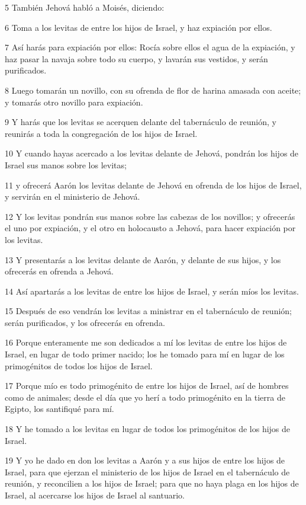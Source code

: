 \par 5 También Jehová habló a Moisés, diciendo:
\par 6 Toma a los levitas de entre los hijos de Israel, y haz expiación por ellos.
\par 7 Así harás para expiación por ellos: Rocía sobre ellos el agua de la expiación, y haz pasar la navaja sobre todo su cuerpo, y lavarán sus vestidos, y serán purificados.
\par 8 Luego tomarán un novillo, con su ofrenda de flor de harina amasada con aceite; y tomarás otro novillo para expiación.
\par 9 Y harás que los levitas se acerquen delante del tabernáculo de reunión, y reunirás a toda la congregación de los hijos de Israel.
\par 10 Y cuando hayas acercado a los levitas delante de Jehová, pondrán los hijos de Israel sus manos sobre los levitas;
\par 11 y ofrecerá Aarón los levitas delante de Jehová en ofrenda de los hijos de Israel, y servirán en el ministerio de Jehová.
\par 12 Y los levitas pondrán sus manos sobre las cabezas de los novillos; y ofrecerás el uno por expiación, y el otro en holocausto a Jehová, para hacer expiación por los levitas.
\par 13 Y presentarás a los levitas delante de Aarón, y delante de sus hijos, y los ofrecerás en ofrenda a Jehová.
\par 14 Así apartarás a los levitas de entre los hijos de Israel, y serán míos los levitas.
\par 15 Después de eso vendrán los levitas a ministrar en el tabernáculo de reunión; serán purificados, y los ofrecerás en ofrenda.
\par 16 Porque enteramente me son dedicados a mí los levitas de entre los hijos de Israel, en lugar de todo primer nacido; los he tomado para mí en lugar de los primogénitos de todos los hijos de Israel.
\par 17 Porque mío es todo primogénito de entre los hijos de Israel, así de hombres como de animales; desde el día que yo herí a todo primogénito en la tierra de Egipto, los santifiqué para mí.
\par 18 Y he tomado a los levitas en lugar de todos los primogénitos de los hijos de Israel.
\par 19 Y yo he dado en don los levitas a Aarón y a sus hijos de entre los hijos de Israel, para que ejerzan el ministerio de los hijos de Israel en el tabernáculo de reunión, y reconcilien a los hijos de Israel; para que no haya plaga en los hijos de Israel, al acercarse los hijos de Israel al santuario.
